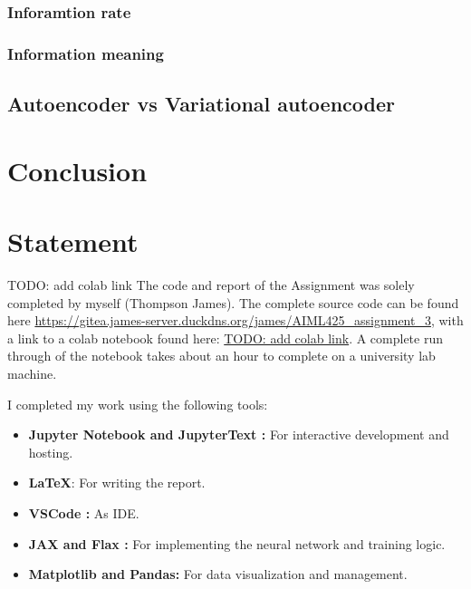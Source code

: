 \documentclass[conference,a4paper]{IEEEtran}
\begin{document}
\subsubsection{Inforamtion rate}

\subsubsection{Information meaning}

\subsection{Autoencoder vs Variational autoencoder}


\section{Conclusion}

\newpage
\section*{Statement}

TODO: add colab link
The code and report of the Assignment was solely completed by myself (Thompson James). The complete source code can be found here \url{https://gitea.james-server.duckdns.org/james/AIML425\_assignment\_3}, with a link to a colab notebook found here: \url{TODO: add colab link}. A complete run through of the notebook takes about an hour to complete on a university lab machine.

I completed my work using the following tools:
\begin{itemize}
    \item \textbf{Jupyter Notebook \cite{Kluyver2016jupyter} and JupyterText \cite{woutsMwoutsJupytext2025}:} For interactive development and hosting.
    \item \textbf{\LaTeX}: For writing the report.
    \item \textbf{VSCode \cite{MicrosoftVscode2025}:} As IDE.
    \item \textbf{JAX \cite{jax2018github} and Flax \cite{flax2020github}:} For implementing the neural network and training logic.
    \item \textbf{Matplotlib\cite{Hunter:2007} and Pandas\cite{thepandasdevelopmentteamPandasdevPandasPandas}:} For data visualization and management.
\end{itemize}




\end{document}
